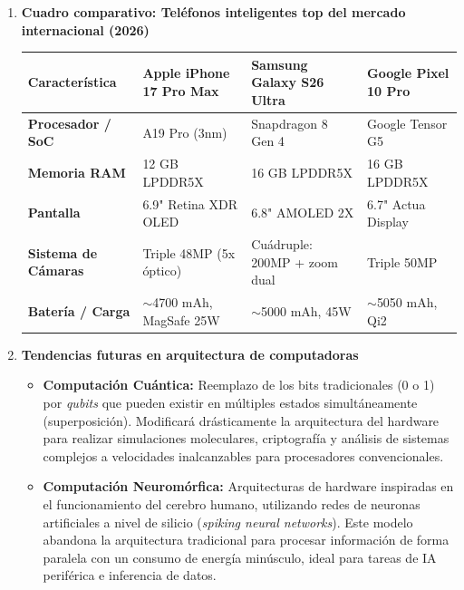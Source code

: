 \documentclass[10pt]{article}
\begin{document}
\begin{enumerate}
    \item \textbf{Cuadro comparativo: Teléfonos inteligentes top del mercado internacional (2026)}

    \begin{center}
    \begin{tabular}{|p{3.2cm}|p{3.5cm}|p{3.5cm}|p{3.5cm}|}
        \hline
        \textbf{Característica} &
        \textbf{Apple iPhone 17 Pro Max} &
        \textbf{Samsung Galaxy S26 Ultra} &
        \textbf{Google Pixel 10 Pro} \\
        \hline

        \textbf{Procesador / SoC} &
        A19 Pro (3nm) &
        Snapdragon 8 Gen 4 &
        Google Tensor G5 \\
        \hline

        \textbf{Memoria RAM} &
        12 GB LPDDR5X &
        16 GB LPDDR5X &
        16 GB LPDDR5X \\
        \hline

        \textbf{Pantalla} &
        6.9" Retina XDR OLED &
        6.8" AMOLED 2X &
        6.7" Actua Display \\
        \hline

        \textbf{Sistema de Cámaras} &
        Triple 48MP (5x óptico) &
        Cuádruple: 200MP + zoom dual &
        Triple 50MP \\
        \hline

        \textbf{Batería / Carga} &
        $\sim$4700 mAh, MagSafe 25W &
        $\sim$5000 mAh, 45W &
        $\sim$5050 mAh, Qi2 \\
        \hline
    \end{tabular}
    \end{center}


    \item \textbf{Tendencias futuras en arquitectura de computadoras}

    \begin{itemize}
        \item \textbf{Computación Cuántica:} Reemplazo de los bits tradicionales (0 o 1) por \textit{qubits} que pueden existir en múltiples estados simultáneamente (superposición). Modificará drásticamente la arquitectura del hardware para realizar simulaciones moleculares, criptografía y análisis de sistemas complejos a velocidades inalcanzables para procesadores convencionales.

        \item \textbf{Computación Neuromórfica:} Arquitecturas de hardware inspiradas en el funcionamiento del cerebro humano, utilizando redes de neuronas artificiales a nivel de silicio (\textit{spiking neural networks}). Este modelo abandona la arquitectura tradicional para procesar información de forma paralela con un consumo de energía minúsculo, ideal para tareas de IA periférica e inferencia de datos.


\end{itemize}
\end{enumerate}
\end{document}
